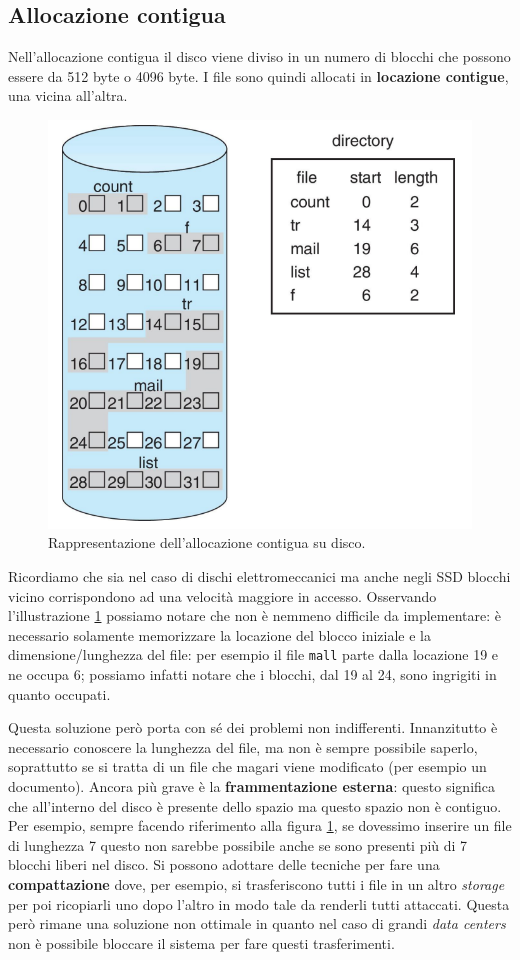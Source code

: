 \subsection{Allocazione contigua}
Nell'allocazione contigua il disco viene diviso in un numero di blocchi che possono essere da 512 byte o 4096 byte. I file sono quindi allocati in \textbf{locazione contigue}, una vicina all'altra.
\begin{figure}[h]
    \centering
    \includegraphics[width = .55\textwidth]{../res/imgs/file system implementation/allocazione contigua.png}
    \caption{Rappresentazione dell'allocazione contigua su disco.}
    \label{fig:allocazione contigua}
\end{figure}
Ricordiamo che sia nel caso di dischi elettromeccanici ma anche negli SSD blocchi vicino corrispondono ad una velocità maggiore in accesso. Osservando l'illustrazione \ref{fig:allocazione contigua} possiamo notare che non è nemmeno difficile da implementare: è necessario solamente memorizzare la locazione del blocco iniziale e la dimensione/lunghezza del file: per esempio il file \texttt{mall} parte dalla locazione 19 e ne occupa 6; possiamo infatti notare che i blocchi, dal 19 al 24, sono ingrigiti in quanto occupati.

Questa soluzione però porta con sé dei problemi non indifferenti. Innanzitutto è necessario conoscere la lunghezza del file, ma non è sempre possibile saperlo, soprattutto se si tratta di un file che magari viene modificato (per esempio un documento). Ancora più grave è la \textbf{frammentazione esterna}: questo significa che all'interno del disco è presente dello spazio ma questo spazio non è contiguo. Per esempio, sempre facendo riferimento alla figura \ref{fig:allocazione contigua}, se dovessimo inserire un file di lunghezza 7 questo non sarebbe possibile anche se sono presenti più di 7 blocchi liberi nel disco. Si possono adottare delle tecniche per fare una \textbf{compattazione} dove, per esempio, si trasferiscono tutti i file in un altro \textit{storage} per poi ricopiarli uno dopo l'altro in modo tale da renderli tutti attaccati. Questa però rimane una soluzione non ottimale in quanto nel caso di grandi \textit{data centers} non è possibile bloccare il sistema per fare questi trasferimenti.


